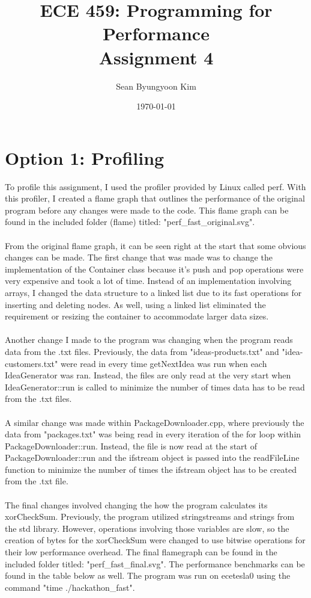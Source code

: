 \documentclass[12pt]{article}
\title{ECE 459: Programming for Performance\\Assignment 4}
\author{Sean Byungyoon Kim}
\date{\today}
\begin{document}
\maketitle
\section*{Option 1: Profiling}

To profile this assignment, I used the profiler provided by Linux called perf. With this profiler, I created a flame graph that outlines the performance of the original program before any changes were made to the code. This flame graph can be found in the included folder (flame) titled: "perf\_fast\_original.svg". 
\\
\\
From the original flame graph, it can be seen right at the start that some obvious changes can be made. The first change that was made was to change the implementation of the Container class because it's push and pop operations were very expensive and took a lot of time. Instead of an implementation involving arrays, I changed the data structure to a linked list due to its fast operations for inserting and deleting nodes. As well, using a linked list eliminated the requirement or resizing the container to accommodate larger data sizes. 
\\
\\
Another change I made to the program was changing when the program reads data from the .txt files. Previously, the data from "ideas-products.txt" and "idea-customers.txt" were read in every time getNextIdea was run when each IdeaGenerator was ran. Instead, the files are only read at the very start when IdeaGenerator::run is called to minimize the number of times data has to be read from the .txt files. 
\\
\\ 
A similar change was made within PackageDownloader.cpp, where previously the data from "packages.txt" was being read in every iteration of the for loop within PackageDownloader::run. Instead, the file is now read at the start of PackageDownloader::run and the ifstream object is passed into the readFileLine function to minimize the number of times the ifstream object has to be created from the .txt file. 
\\ 
\\
The final changes involved changing the how the program calculates its xorCheckSum. Previously, the program utilized stringstreams and strings from the std library. However, operations involving those variables are slow, so the creation of bytes for the xorCheckSum were changed to use bitwise operations for their low performance overhead. The final flamegraph can be found in the included folder titled: "perf\_fast\_final.svg". The performance benchmarks can be found in the table below as well. The program was run on ecetesla0 using the command "time ./hackathon\_fast". 
\end{document}

